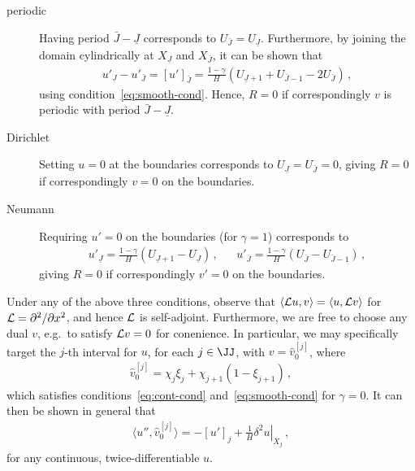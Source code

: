 \documentclass[12pt,a5paper]{article}
\begin{document}
\begin{description}
\item[periodic] Having period $\bar{J}-\underline{J}$ corresponds to \(U_{\bar{J}}=U_{\underline{J}}\). Furthermore, by joining
the domain cylindrically at $X_{\underline{J}}$ and $X_{\bar{J}}$,  it can be shown that
\begin{eqnarray}
u'_{\underline{J}}-u'_{\bar{J}} = [u']_{\bar{J}} = \frac{1-\gamma}{H}(U_{\underline{J}+1}+U_{\bar{J}-1}-2U_{\bar{J}})\,,
\end{eqnarray}
using condition~\eqref{eq:smooth-cond}. Hence, $R=0$ if correspondingly $v$ is periodic with period $\bar{J}-\underline{J}$.
\item[Dirichlet] Setting \(u=0\) at the boundaries corresponds to \(U_{\underline{J}}=U_{\bar{J}}=0\), 
giving $R=0$ if correspondingly \(v=0\) on the boundaries.
\item[Neumann] Requiring \(u'=0\) on the boundaries  (for $\gamma=1$) corresponds to 
\begin{eqnarray}
u'_{\underline{J}}=\frac{1-\gamma}{H}(U_{\underline{J}+1}-U_{\underline{J}})\,,
&&
u'_{\bar{J}}=\frac{1-\gamma}{H}(U_{\bar{J}}-U_{\bar{J}-1})\,,
\end{eqnarray}
giving $R=0$ if correspondingly \(v'=0\) on the boundaries.
\end{description}
Under any of the above three conditions, observe that $\langle{\cal L}u,v\rangle =\langle u,{\cal L}v\rangle$
for ${\cal L}=\DD {x}{}$, and hence ${\cal L}$ is self-adjoint.
Furthermore, we are free to choose any dual $v$, e.g.\ to satisfy ${\cal L}v=0$ for conenience.
In particular, we may specifically target the $j$-th interval for $u$, for each $j\in\JJ$,  with $v=\hat{v}_0^{[j]}$, where
\begin{eqnarray}
\hat{v}_0^{[j]} = \chi_j\xi_j + \chi_{j+1}(1-\xi_{j+1})\,,
\label{eq:vhat0}
\end{eqnarray}
which satisfies conditions~\eqref{eq:cont-cond} and~\eqref{eq:smooth-cond} for $\gamma=0$.
It can then be shown in general that
\begin{eqnarray}
\langle u'', \hat{v}_0^{[j]}\rangle = -[u']_j+\frac{1}{H}\left.\delta^2 u\right|_{X_j}\,,
\label{eq:udd:vhat0}
\end{eqnarray}
for any continuous, twice-differentiable $u$.
\end{document}
